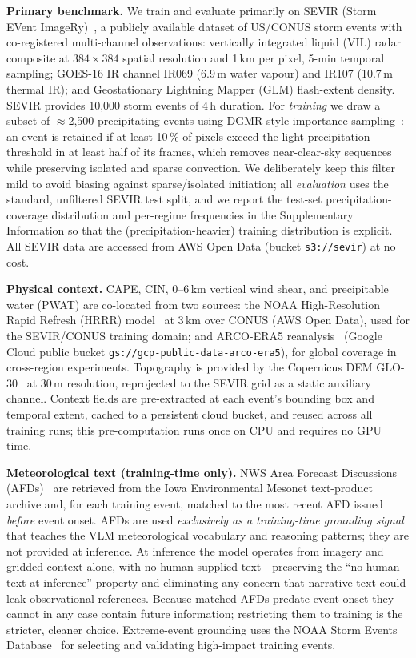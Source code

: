\documentclass[fleqn,10pt]{wlscirep}
\begin{document}
\textbf{Primary benchmark.}
We train and evaluate primarily on SEVIR (Storm EVent ImageRy)~\cite{veillette2020sevir}, a publicly available dataset of US/CONUS storm events with co-registered multi-channel observations: vertically integrated liquid (VIL) radar composite at $384{\times}384$ spatial resolution and 1\,km per pixel, 5-min temporal sampling; GOES-16 IR channel IR069 (6.9\,\textmu m water vapour) and IR107 (10.7\,\textmu m thermal IR); and Geostationary Lightning Mapper (GLM) flash-extent density.
SEVIR provides 10,000 storm events of 4\,h duration.
For \emph{training} we draw a subset of $\approx$2,500 precipitating events using DGMR-style importance sampling~\cite{ravuri2021dgmr}: an event is retained if at least 10\,\% of pixels exceed the light-precipitation threshold in at least half of its frames, which removes near-clear-sky sequences while preserving isolated and sparse convection.
We deliberately keep this filter mild to avoid biasing against sparse/isolated initiation; all \emph{evaluation} uses the standard, unfiltered SEVIR test split, and we report the test-set precipitation-coverage distribution and per-regime frequencies in the Supplementary Information so that the (precipitation-heavier) training distribution is explicit.
All SEVIR data are accessed from AWS Open Data (bucket \texttt{s3://sevir}) at no cost.

\textbf{Physical context.}
CAPE, CIN, 0--6\,km vertical wind shear, and precipitable water (PWAT) are co-located from two sources: the NOAA High-Resolution Rapid Refresh (HRRR) model~\cite{noaa_hrrr} at 3\,km over CONUS (AWS Open Data), used for the SEVIR/CONUS training domain; and ARCO-ERA5 reanalysis~\cite{carver2023arco} (Google Cloud public bucket \texttt{gs://gcp-public-data-\allowbreak{}arco-era5}), for global coverage in cross-region experiments.
Topography is provided by the Copernicus DEM GLO-30~\cite{copernicus_dem} at 30\,m resolution, reprojected to the SEVIR grid as a static auxiliary channel.
Context fields are pre-extracted at each event's bounding box and temporal extent, cached to a persistent cloud bucket, and reused across all training runs; this pre-computation runs once on CPU and requires no GPU time.

\textbf{Meteorological text (training-time only).}
NWS Area Forecast Discussions (AFDs)~\cite{iem_afd} are retrieved from the Iowa Environmental Mesonet text-product archive and, for each training event, matched to the most recent AFD issued \emph{before} event onset.
AFDs are used \emph{exclusively as a training-time grounding signal} that teaches the VLM meteorological vocabulary and reasoning patterns; they are not provided at inference.
At inference the model operates from imagery and gridded context alone, with no human-supplied text---preserving the ``no human text at inference'' property and eliminating any concern that narrative text could leak observational references.
Because matched AFDs predate event onset they cannot in any case contain future information; restricting them to training is the stricter, cleaner choice.
Extreme-event grounding uses the NOAA Storm Events Database~\cite{noaa_storm_events} for selecting and validating high-impact training events.
\end{document}
